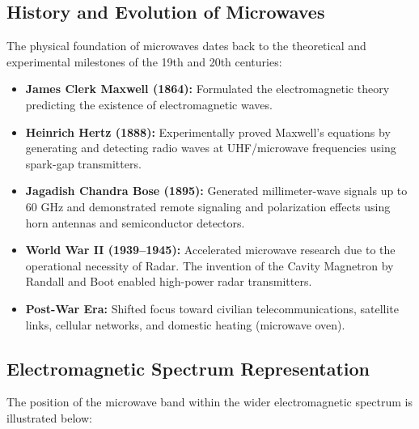 \documentclass[12pt,a4paper]{article}
\begin{document}
\subsection{History and Evolution of Microwaves}
The physical foundation of microwaves dates back to the theoretical and experimental milestones of the 19th and 20th centuries:
\begin{itemize}[leftmargin=*, itemsep=3pt]
  \item \textbf{James Clerk Maxwell (1864):} Formulated the electromagnetic theory predicting the existence of electromagnetic waves.
  \item \textbf{Heinrich Hertz (1888):} Experimentally proved Maxwell's equations by generating and detecting radio waves at UHF/microwave frequencies using spark-gap transmitters.
  \item \textbf{Jagadish Chandra Bose (1895):} Generated millimeter-wave signals up to 60 GHz and demonstrated remote signaling and polarization effects using horn antennas and semiconductor detectors.
  \item \textbf{World War II (1939--1945):} Accelerated microwave research due to the operational necessity of Radar. The invention of the Cavity Magnetron by Randall and Boot enabled high-power radar transmitters.
  \item \textbf{Post-War Era:} Shifted focus toward civilian telecommunications, satellite links, cellular networks, and domestic heating (microwave oven).
\end{itemize}

\subsection{Electromagnetic Spectrum Representation}
The position of the microwave band within the wider electromagnetic spectrum is illustrated below:
\end{document}
